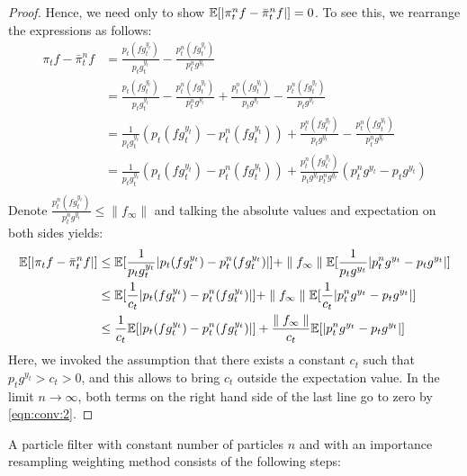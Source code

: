 \begin{proof}
	Hence, we need only to show $\mathbb{E}[|\pi^n_t f - \bar{\pi}^n_t f|] = 0$. To see this, we rearrange the expressions as follows:
	\begin{align}
	\pi_t f - \bar{\pi}^n_t f & = \frac{p_t(fg_t^{y_t}) }{p_t g_t^{y_t}} - \frac{p^n_t(fg_t^{y_t})}{p^n_t g^{y_t}} \\
	& = \frac{p_t(fg_t^{y_t}) }{p_t g_t^{y_t}} - \frac{p^n_t(fg_t^{y_t})}{p^n_t g^{y_t}} + \frac{p^n_t(fg_t^{y_t})}{p_t g^{y_t}} - \frac{p^n_t(fg_t^{y_t})}{p_t g^{y_t}}\\
	& = \frac{1}{p_t g_t^{y_t}} \left( p_t(fg_t^{y_t}) - p^n_t(fg_t^{y_t})\right)  + \frac{p^n_t(fg_t^{y_t})}{p_t g^{y_t}} - \frac{p^n_t(fg_t^{y_t})}{p^n_t g^{y_t}} \\
	& = \frac{1}{p_t g_t^{y_t}} \left( p_t(fg_t^{y_t}) - p^n_t(fg_t^{y_t})\right)  + \frac{p^n_t(fg_t^{y_t})}{p_t g^{y_t}p^n_t g^{y_t}} \left(p^n_t g^{y_t} - p_t g^{y_t} \right) \\
	\end{align}
	Denote $\frac{p^n_t(fg_t^{y_t})}{p^n_t g^{y_t}} \leq \parallel f_\infty \parallel$ and talking the absolute values and expectation on both sides yields:
	\begin{align}
	\mathbb{E}[|\pi_t f - \bar{\pi}^n_t f|]	& \leq \mathbb{E}[\frac{1}{p_t g_t^{y_t}} | p_t(fg_t^{y_t}) - p^n_t(fg_t^{y_t})|]  + \parallel f_\infty \parallel\mathbb{E}[\frac{ 1}{p_t g^{y_t}} |p^n_t g^{y_t} - p_t g^{y_t} |]  \\
	& \leq \mathbb{E}[\frac{1}{c_t} | p_t(fg_t^{y_t}) - p^n_t(fg_t^{y_t})|]  + \parallel f_\infty \parallel\mathbb{E}[\frac{1}{c_t} |p^n_t g^{y_t} - p_t g^{y_t} |] \\
	& \leq \frac{1}{c_t} \mathbb{E}[| p_t(fg_t^{y_t}) - p^n_t(fg_t^{y_t})|]  + \frac{\parallel f_\infty \parallel}{c_t} \mathbb{E}[ |p^n_t g^{y_t} - p_t g^{y_t} |] 
	\end{align} Here, we invoked the assumption that there exists a constant $c_t$ such that $p_t g^{y_t} > c_t > 0$, and this allows to bring $c_t$ outside the expectation value. In the limit $n \to \infty$, both terms on the right hand side of the last line go to zero by \cref{eqn:conv:2}.
\end{proof}
A particle filter with constant number of particles $n$ and with an importance resampling weighting method consists of the following steps:
